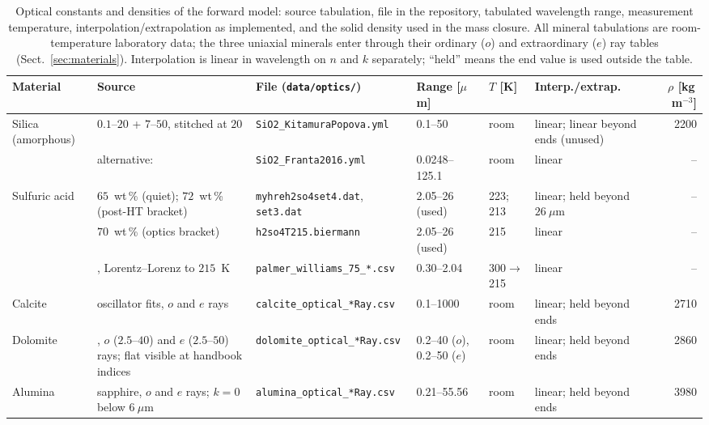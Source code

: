 \begin{table}[t]
\centering
\caption{Optical constants and densities of the forward model: source tabulation, file in the
repository, tabulated wavelength range, measurement temperature, interpolation/extrapolation
as implemented, and the solid density used in the mass closure. All mineral tabulations are
room-temperature laboratory data; the three uniaxial minerals enter through their ordinary ($o$)
and extraordinary ($e$) ray tables (Sect.~\ref{sec:materials}). Interpolation is linear in
wavelength on $n$ and $k$ separately; ``held'' means the end value is used outside the table.}
\label{tab:optical_provenance}
\footnotesize
\begin{tabular}{l p{5.6cm} p{3.0cm} p{2.2cm} l p{2.4cm} r}
\toprule
Material & Source & File (\texttt{data/optics/}) & Range [$\mu$m] & $T$ [K] & Interp./extrap. & $\rho$ [kg\,m$^{-3}$] \\
\midrule
Silica (amorphous) & \citet{Kitamura2007} $0.1$--$20$ + \citet{Popova1972} $7$--$50$, stitched at $20$ & \texttt{SiO2\_KitamuraPopova.yml} & 0.1--50 & room & linear; linear beyond ends (unused) & 2200 \\
 & alternative: \citet{Franta2016} & \texttt{SiO2\_Franta2016.yml} & 0.0248--125.1 & room & linear & -- \\
Sulfuric acid & \citet{LundMyhre2003} $65$~wt\,\% (quiet); $72$~wt\,\% (post-HT bracket) & \texttt{myhreh2so4set4.dat}, \texttt{set3.dat} & 2.05--26 (used) & 223; 213 & linear; held beyond $26~\mu$m & -- \\
 & \citet{Biermann2000} $70$~wt\,\% (optics bracket) & \texttt{h2so4T215.biermann} & 2.05--26 (used) & 215 & linear & -- \\
 & \citet{PalmerWilliams1975}, Lorentz--Lorenz to $215$~K & \texttt{palmer\_williams\_75\_*.csv} & 0.30--2.04 & 300$\to$215 & linear & -- \\
Calcite & \citet{Long1993} oscillator fits, $o$ and $e$ rays & \texttt{calcite\_optical\_*Ray.csv} & 0.1--1000 & room & linear; held beyond ends & 2710 \\
Dolomite & \citet{Querry1987}, $o$ ($2.5$--$40$) and $e$ ($2.5$--$50$) rays; flat visible at handbook indices & \texttt{dolomite\_optical\_*Ray.csv} & 0.2--40 ($o$), 0.2--50 ($e$) & room & linear; held beyond ends & 2860 \\
Alumina & \citet{Querry1985} sapphire, $o$ and $e$ rays; $k=0$ below $6~\mu$m & \texttt{alumina\_optical\_*Ray.csv} & 0.21--55.56 & room & linear; held beyond ends & 3980 \\
\bottomrule
\end{tabular}
\end{table}
